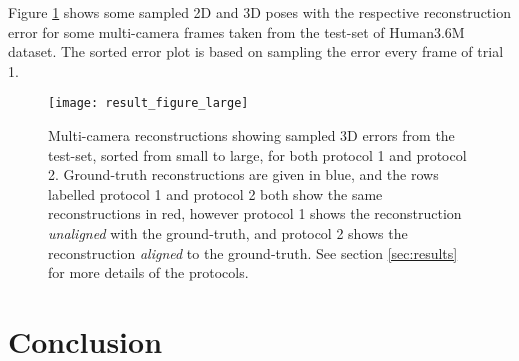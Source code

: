 \documentclass[10pt,twocolumn,letterpaper]{article}
\renewcommand*{\arraystretch}{.6}
\begin{document}
\begin{table}[tb]
\renewcommand{\arraystretch}{1.1}
 \caption {Quantitative evaluation performed on existing approaches,
  demonstrating the performance gain when various models are trained with
  our additional data.  \label{tab:training_differences}}
\end{table}

Figure \ref{fig:results} shows some sampled 2D and 3D poses with the respective
reconstruction error for some multi-camera frames taken from the test-set of
Human3.6M dataset. The sorted error plot is based on sampling
the error every  frame of trial 1.


\begin{figure}[tb]
 \hspace{-3mm}\texttt{[image: result\_figure\_large]}
 \caption{Multi-camera reconstructions showing sampled 3D errors from the test-set,
   sorted from small to large, for both protocol 1 and protocol
   2. Ground-truth reconstructions are given in blue, and the rows labelled
   protocol 1 and protocol 2 both show the same reconstructions in red, however
   protocol 1 shows the reconstruction {\em unaligned} with the ground-truth,
   and protocol 2 shows the reconstruction {\em aligned} to the
   ground-truth.  \label{fig:results} See section \ref{sec:results} for more
   details of the protocols.}
\end{figure}

\section{Conclusion}
\end{document}
